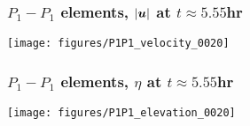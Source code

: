 

\begin{frame}[t]
  \frametitle{$P_1-P_1$ elements, $|{\boldsymbol{u}}|$ at $t\approx 5.55$hr}
\vspace{-0.2in}
  \begin{center}
    \texttt{[image: figures/P1P1\_velocity\_0020]}
  \end{center}
\end{frame}

\begin{frame}[t]
  \frametitle{$P_1-P_1$ elements, $\eta$ at $t\approx 5.55$hr}
\vspace{-0.2in}
  \begin{center}
    \texttt{[image: figures/P1P1\_elevation\_0020]}
  \end{center}
\end{frame}
